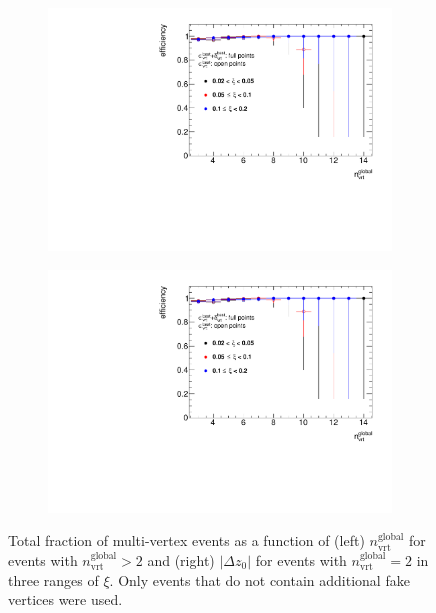 \begin{figure}[h!]
	\centering
	\begin{subfigure}{.47\textwidth}
		\includegraphics[width=\textwidth,page=2]{chapters/chrgSTAR/img/vertex/vertexEffi_ksi_noFake.pdf}
	\end{subfigure}
	\begin{subfigure}{.47\textwidth}
		\includegraphics[width=\textwidth,page=9]{chapters/chrgSTAR/img/vertex/vertexEffi_ksi_noFake.pdf}
	\end{subfigure}
	\caption{Total fraction of multi-vertex events as a function of (left) $n_\textrm{vrt}^\textrm{global}$ for events with $n^\textrm{global}_\textrm{vrt}>2$ and (right) $|\Delta z_0|$ for events with $n^\textrm{global}_\textrm{vrt}=2$  in three ranges of $\xi$. Only events that do not contain additional fake vertices were used. }
	\label{fig:vertexVetoDZ_noFake}
\end{figure}


